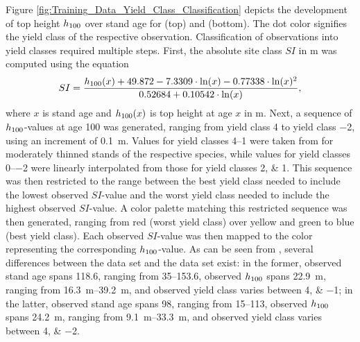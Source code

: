 Figure \ref{fig:Training_Data_Yield_Class_Classification} depicts the development of top height \(h_{100}\) over stand age for \beech{} (top) and \spruce{} (bottom).  The dot color signifies the yield class of the respective observation.  Classification of observations into yield classes required multiple steps.  First, the absolute site class \(SI\) in \si{\meter} was computed using the equation
\begin{equation}
  \label{eq:nagel_function_solved_for_SI}
  SI = \frac{h_{100}(x) + 49.872 - 7.3309 \cdot \ln(x) - 0.77338 \cdot \ln(x)^2 }{0.52684 + 0.10542 \cdot \ln(x)} ,
\end{equation}
\parencite{Nagel} where \(x\) is stand age and \(h_{100}(x)\) is top height at age \(x\) in \si{\meter}.  Next, a sequence of \(h_{100}{}\)-values at age \SI{100}{\years} was generated, ranging from yield class \num{4} to yield class \num{-2}, using an increment of \SI{0.1}{\meter}.  Values for yield classes \numrange{4}{1} were taken from \textcite{Schober1995} for moderately thinned stands of the respective species, while values for yield classes \numrange{0}{-2} were linearly interpolated from those for yield classes \numlist{2; 1}.  This sequence was then restricted to the range between the best yield class needed to include the lowest observed \(SI\)-value and the worst yield class needed to include the highest observed \(SI\)-value.  A color palette matching this restricted sequence was then generated, ranging from red (worst yield class) over yellow and green to blue (best yield class).  Each observed \(SI\)-value was then mapped to the color representing the corresponding \(h_{100}{}\)-value.  As can be seen from , several differences between the \beech{} data set and the \spruce{} data set exist:
in the former, observed stand age spans \SI{118.6}{\years}, ranging from \SIrange{35}{153.6}{\years}, observed \(h_{100}{}\) spans \SI{22.9}{\meter}, ranging from \SIrange{16.3}{39.2}{\meter}, and observed yield class varies between \numlist{4; -1};
in the latter, observed stand age spans \SI{98}{\years}, ranging from \SIrange{15}{113}{\years}, observed \(h_{100}{}\) spans \SI{24.2}{\meter}, ranging from \SIrange{9.1}{33.3}{\meter}, and observed yield class varies between \numlist{4; -2}.

